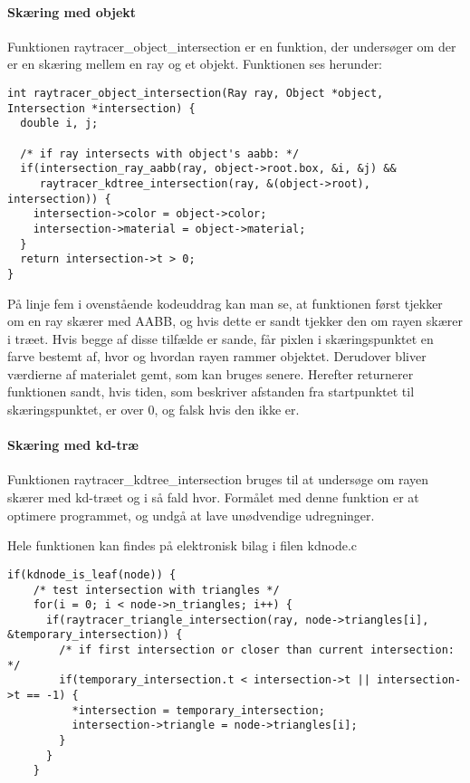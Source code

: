 \paragraph{Skæring med objekt}

Funktionen raytracer\_object\_intersection er en funktion, der undersøger om der er en skæring mellem en ray og et objekt. Funktionen ses herunder:

\begin{lstlisting}[style=Cstyle, caption=raytracer\_object\_intersection]
int raytracer_object_intersection(Ray ray, Object *object, Intersection *intersection) {
  double i, j;
  
  /* if ray intersects with object's aabb: */
  if(intersection_ray_aabb(ray, object->root.box, &i, &j) && 
     raytracer_kdtree_intersection(ray, &(object->root), intersection)) {
    intersection->color = object->color;
    intersection->material = object->material;
  }
  return intersection->t > 0;
}
\end{lstlisting}

På linje fem i ovenstående kodeuddrag kan man se, at funktionen først tjekker om en ray skærer med AABB, og hvis dette er sandt tjekker den om rayen skærer i træet. Hvis begge af disse tilfælde er sande, får pixlen i skæringspunktet en farve bestemt af, hvor og hvordan rayen rammer objektet. Derudover bliver værdierne af materialet gemt, som kan bruges senere. Herefter returnerer funktionen sandt, hvis tiden, som beskriver afstanden fra startpunktet til skæringspunktet, er over 0, og falsk hvis den ikke er.


\paragraph{Skæring med kd-træ}

Funktionen raytracer\_kdtree\_intersection bruges til at undersøge om rayen skærer med kd-træet og i så fald hvor. Formålet med denne funktion er at optimere programmet, og undgå at lave unødvendige udregninger. 

Hele funktionen kan findes på elektronisk bilag i filen kdnode.c

\begin{lstlisting}[style=Cstyle, caption= Uddrag af funktionen raytracer\_kdtree\_intersection]
  if(kdnode_is_leaf(node)) {
    /* test intersection with triangles */
    for(i = 0; i < node->n_triangles; i++) {
      if(raytracer_triangle_intersection(ray, node->triangles[i], &temporary_intersection)) {
        /* if first intersection or closer than current intersection: */
        if(temporary_intersection.t < intersection->t || intersection->t == -1) {
          *intersection = temporary_intersection;
          intersection->triangle = node->triangles[i];
        }
      }
    }
\end{lstlisting}

